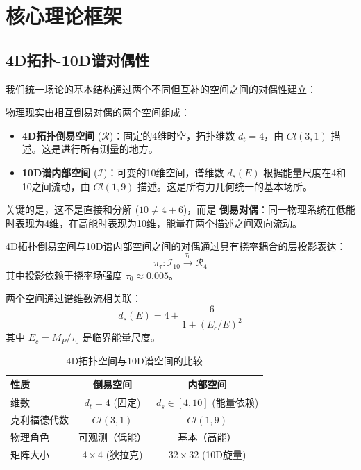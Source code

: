 \section{核心理论框架}
\label{sec:core}

\subsection{4D拓扑-10D谱对偶性}

我们统一场论的基本结构通过两个不同但互补的空间之间的对偶性建立：

\begin{insight}[4D拓扑与10D谱]
物理现实由相互倒易对偶的两个空间组成：
\begin{itemize}
    \item \textbf{4D拓扑倒易空间} ($\mathcal{R}$)：固定的4维时空，拓扑维数 $d_t = 4$，由 $Cl(3,1)$ 描述。这是进行所有测量的地方。
    
    \item \textbf{10D谱内部空间} ($\mathcal{I}$)：可变的10维空间，谱维数 $d_s(E)$ 根据能量尺度在4和10之间流动，由 $Cl(1,9)$ 描述。这是所有力几何统一的基本场所。
\end{itemize}

关键的是，这不是直接和分解 ($10 \neq 4 + 6$)，而是 \textbf{倒易对偶}：同一物理系统在低能时表现为4维，在高能时表现为10维，能量在两个描述之间双向流动。
\end{insight}

\begin{definition}[倒易-内部对偶性]
4D拓扑倒易空间与10D谱内部空间之间的对偶通过具有挠率耦合的层投影表达：
\begin{equation}
    \pi_{\tau}: \mathcal{I}_{10} \xrightarrow{\tau_0} \mathcal{R}_{4}
\end{equation}
其中投影依赖于挠率场强度 $\tau_0 \approx 0.005$。

两个空间通过谱维数流相关联：
\begin{equation}
    d_s(E) = 4 + \frac{6}{1 + (E_c/E)^2}
\end{equation}
其中 $E_c = M_P/\tau_0$ 是临界能量尺度。
\end{definition}

\begin{table}[htbp]
\centering
\caption{4D拓扑空间与10D谱空间的比较}
\begin{tabular}{@{}lcc@{}}
\hline
\textbf{性质} & \textbf{倒易空间} & \textbf{内部空间} \\
\hline
维数 & $d_t = 4$ (固定) & $d_s \in [4, 10]$ (能量依赖) \\
克利福德代数 & $Cl(3,1)$ & $Cl(1,9)$ \\
物理角色 & 可观测（低能） & 基本（高能） \\
矩阵大小 & $4 \times 4$ (狄拉克) & $32 \times 32$ (10D旋量) \\
\hline
\end{tabular}
\label{tab:space_comparison}
\end{table}

